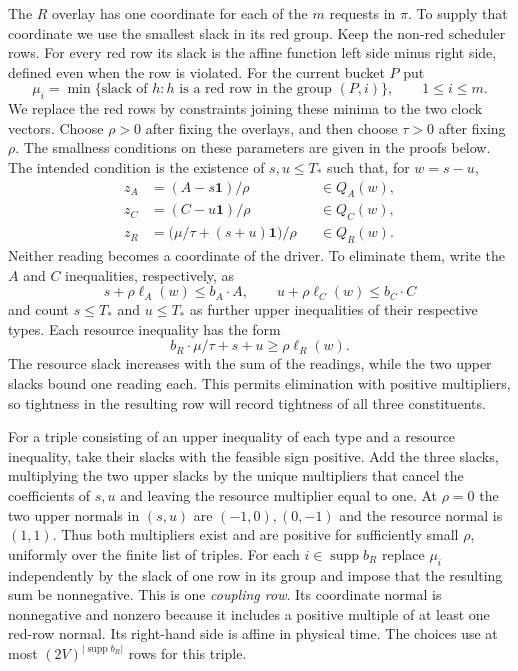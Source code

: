 The \(R\) overlay has one coordinate for each of the \(m\) requests in
\(\pi\). To supply that coordinate we use the smallest slack in its red
group. Keep the non-red scheduler rows. For every red row its slack is
the affine function left side minus right side, defined even when the
row is violated. For the current bucket \(P\) put
\[
       \mu_i=\min\{\text{slack of }h:h\text{ is a red row
       in the group }(P,i)\},\qquad 1\le i\le m.
\]
We replace the red rows by constraints joining these minima to the
two clock vectors. Choose \(\rho>0\) after fixing the overlays, and
then choose \(\tau>0\) after fixing \(\rho\). The smallness conditions
on these parameters are given in the proofs below.
The intended condition is the existence of $s,u\le T_*$ such that, for
$w=s-u$,
\begin{equation}\label{eq:driver-memberships}
\begin{aligned}
 z_A&=(A-s\mathbf1)/\rho                       &&\in Q_A(w),\\
 z_C&=(C-u\mathbf1)/\rho                       &&\in Q_C(w),\\
 z_R&=\bigl(\mu/\tau+(s+u)\mathbf1\bigr)/\rho    &&\in Q_R(w).
\end{aligned}
\end{equation}
Neither reading becomes a coordinate of the driver. To eliminate them,
write the $A$ and $C$ inequalities, respectively, as
\[
     s+\rho\ell_A(w)\le b_A\cdot A,\qquad
     u+\rho\ell_C(w)\le b_C\cdot C
\]
and count $s\le T_*$ and $u\le T_*$ as further upper inequalities of
their respective types. Each resource inequality has the form
\[
       b_R\cdot\mu/\tau+s+u\ge\rho\ell_R(w).
\]
The resource slack increases with the sum of the readings, while the
two upper slacks bound one reading each. This permits elimination with
positive multipliers, so tightness in the resulting row will record
tightness of all three constituents.

For a triple consisting of an upper inequality of each type and a
resource inequality, take their slacks with the feasible sign positive.
Add the three slacks, multiplying the two upper slacks by the unique
multipliers that cancel the coefficients of $s,u$ and leaving the
resource multiplier equal to one. At $\rho=0$ the two upper normals in
$(s,u)$ are $(-1,0),(0,-1)$ and the resource normal is $(1,1)$.
Thus both multipliers exist and are positive for sufficiently small
$\rho$, uniformly over the finite list of triples. For each
$i\in\operatorname{supp} b_R$ replace $\mu_i$ independently by the
slack of one row in its group and impose that the resulting sum be
nonnegative. This is one \emph{coupling row}. Its coordinate normal is
nonnegative and nonzero because it includes a positive multiple of at
least one red-row normal. Its right-hand side is affine in physical time.
The choices use at most $(2V)^{|\operatorname{supp} b_R|}$ rows for this
triple.

